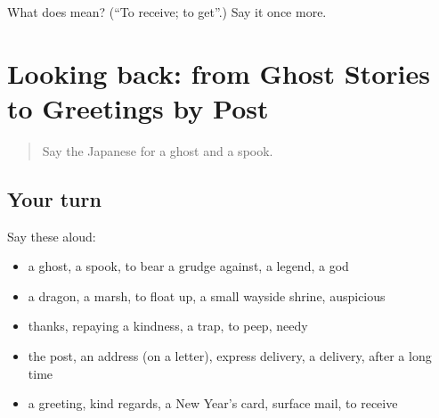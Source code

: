\begin{tcolorbox}[breakable,colback=teal!4,colframe=teal!35!black,title={Before you move on}]
What does  mean? (\textquotedblleft{}To receive; to get\textquotedblright{}.) Say it once more.
\end{tcolorbox}
\section[(dialogue)]{Looking back: from Ghost Stories to Greetings by Post}

\label{lesson:JA-R306-review-302-306}



\begin{quote}
Say the Japanese for a ghost and a spook.
\end{quote}

\subsection*{Your turn}
Say these aloud:

\begin{itemize}
\raggedright
  \item a ghost, a spook, to bear a grudge against, a legend, a god
  \item a dragon, a marsh, to float up, a small wayside shrine, auspicious
  \item thanks, repaying a kindness, a trap, to peep, needy
  \item the post, an address (on a letter), express delivery, a delivery, after a long time
  \item a greeting, kind regards, a New Year's card, surface mail, to receive
\end{itemize}

